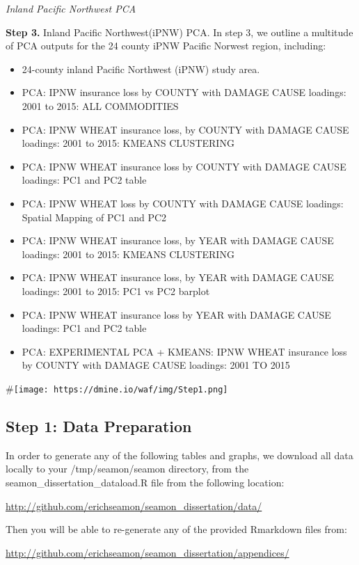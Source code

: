 \documentclass[]{article}
\begin{document}
\emph{Inland Pacific Northwest PCA}

\textbf{Step 3.} Inland Pacific Northwest(iPNW) PCA. In step 3, we
outline a multitude of PCA outputs for the 24 county iPNW Pacific
Norwest region, including:

\begin{itemize}
\item
  24-county inland Pacific Northwest (iPNW) study area.
\item
  PCA: IPNW insurance loss by COUNTY with DAMAGE CAUSE loadings: 2001 to
  2015: ALL COMMODITIES
\item
  PCA: IPNW WHEAT insurance loss, by COUNTY with DAMAGE CAUSE loadings:
  2001 to 2015: KMEANS CLUSTERING
\item
  PCA: IPNW WHEAT insurance loss by COUNTY with DAMAGE CAUSE loadings:
  PC1 and PC2 table
\item
  PCA: IPNW WHEAT loss by COUNTY with DAMAGE CAUSE loadings: Spatial
  Mapping of PC1 and PC2
\item
  PCA: IPNW WHEAT insurance loss, by YEAR with DAMAGE CAUSE loadings:
  2001 to 2015: KMEANS CLUSTERING
\item
  PCA: IPNW WHEAT insurance loss, by YEAR with DAMAGE CAUSE loadings:
  2001 to 2015: PC1 vs PC2 barplot
\item
  PCA: IPNW WHEAT insurance loss by YEAR with DAMAGE CAUSE loadings: PC1
  and PC2 table
\item
  PCA: EXPERIMENTAL PCA + KMEANS: IPNW WHEAT insurance loss by COUNTY
  with DAMAGE CAUSE loadings: 2001 TO 2015
\end{itemize}

\#\texttt{[image: https://dmine.io/waf/img/Step1.png]}

\hypertarget{step-1-data-preparation}{%
\subsection{Step 1: Data Preparation}\label{step-1-data-preparation}}

In order to generate any of the following tables and graphs, we download
all data locally to your /tmp/seamon/seamon directory, from the
seamon\_dissertation\_dataload.R file from the following location:

\url{http://github.com/erichseamon/seamon_dissertation/data/}

Then you will be able to re-generate any of the provided Rmarkdown files
from:

\url{http://github.com/erichseamon/seamon_dissertation/appendices/}
\end{document}
